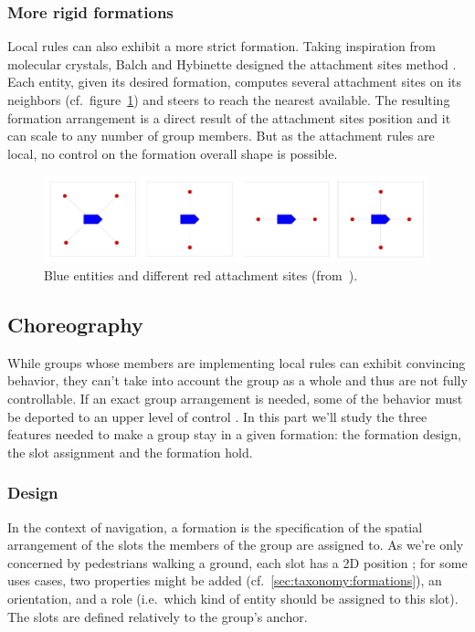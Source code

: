 \documentclass[a4paper,titlepage]{article}
\begin{document}
\subsubsection{More rigid formations}

Local rules can also exhibit a more strict formation. Taking inspiration from molecular crystals, Balch and Hybinette designed the attachment sites method \cite{Balch:2000bn}. Each entity, given its desired formation, computes several attachment sites on its neighbors (cf.\ figure~\ref{fig:attachment_sites}) and steers to reach the nearest available. The resulting formation arrangement is a direct result of the attachment sites position and it can scale to any number of group members. But as the attachment rules are local, no control on the formation overall shape is possible. 

\begin{figure}[h]
\centering
\includegraphics[width=\textwidth]{AttachmentSites.jpg}
\caption{Blue entities and different red attachment sites (from~\cite{Balch:2000bn}).}
\label{fig:attachment_sites}
\end{figure} 

\subsection{Choreography}
\label{sec:stay_grouped:choreography}

While groups whose members are implementing local rules can exhibit convincing behavior, they can’t take into account the group as a whole and thus are not fully controllable. If an exact group arrangement is needed, some of the behavior must be deported to an upper level of control \cite{MusTha2001}. In this part we’ll study the three features needed to make a group stay in a given formation: the formation design, the slot assignment and the formation hold.

\subsubsection{Design}

In the context of navigation, a formation is the specification of the spatial arrangement of the slots the members of the group are assigned to. As we're only concerned by pedestrians walking a ground, each slot has a 2D position ; for some uses cases, two properties might be added (cf.\ \ref{sec:taxonomy:formations}), an orientation, and a role (i.e.\ which kind of entity should be assigned to this slot). The slots are defined relatively to the group's anchor.
\end{document}
